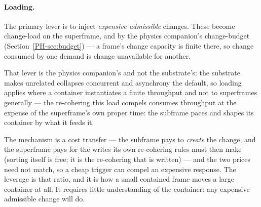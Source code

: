 \documentclass[11pt,a4paper]{article}
\theoremstyle{remark}
\begin{document}
\paragraph{Loading.} The primary lever is to inject \emph{expensive admissible} changes. These become change-load on the superframe, and by the physics companion's change-budget (Section~\ref{PH-sec:budget}) --- a frame's change capacity is finite there, so change consumed by one demand is change unavailable for another.

That lever is the physics companion's and not the substrate's: the substrate makes unrelated collapses concurrent and asynchrony the default, so loading applies where a container instantiates a finite throughput and not to superframes generally --- the re-cohering this load compels consumes throughput at the expense of the superframe's own proper time: the subframe paces and shapes its container by what it feeds it.

The mechanism is a cost transfer --- the subframe pays to \emph{create} the change, and the superframe pays for the writes its own re-cohering rules must then make (sorting itself is free; it is the re-cohering that is written) --- and the two prices need not match, so a cheap trigger can compel an expensive response. The leverage is that ratio, and it is how a small contained frame moves a large container at all. It requires little understanding of the container: any expensive admissible change will do.
\end{document}
